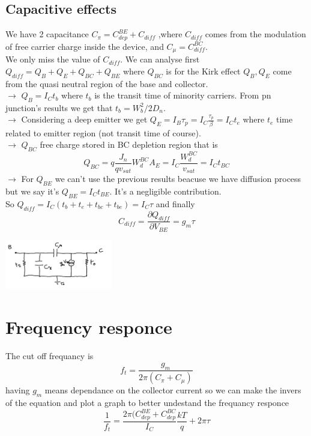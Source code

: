\subsection{Capacitive effects}
We have 2 capacitance $C_\pi=C_{dep}^{BE}+C_{diff}$ ,where $C_{diff}$ comes from the modulation of free carrier charge inside the device, and $C_\mu=C_{diff}^{BC}$.\\
We only miss the value of $C_{diff}$. We can analyse first $Q_{diff}=Q_B+Q_E+Q_{BC}+Q_{BE}$ where $Q_{BC}$ is for the Kirk effect $Q_B,Q_E$ come from the quasi neutral region of the base and collector.\\
\vspace{5mm}
$\rightarrow$ $Q_B=I_Ct_b$ where $t_b$ is the transit time of minority carriers. From pn junction's results we get that $t_b=W_b^2/2D_n$.\\
$\rightarrow$ Considering a deep emitter we get $Q_E=I_B\tau_p=I_C \frac{\tau_p}{\beta}=I_Ct_e$ where $t_e$ time related to emitter region (not transit time of course). \\
$\rightarrow$ $Q_{BC}$ free charge stored in BC depletion region that is
\begin{equation}
Q_{BC}=q \frac{J_n}{qv_{sat}}W_d^{BC}A_E=I_C \frac{W_d^{BC}}{v_{sat}}=I_C t_{BC}
\end{equation}
$\rightarrow$ For $Q_{BE}$ we can't use the previous results beacuse we have diffusion process but we say it's $Q_{BE}=I_Ct_{BE}$. It's a negligible contribution.\\
\vspace{5mm}
So $Q_{diff}=I_C(t_b+t_e+t_{bc}+t_{be})=I_C \tau$ and finally
\begin{equation}
C_{diff}=\frac{\partial Q_{diff}}{\partial V_{BE}}=g_m\tau
\end{equation}

\centering
\includegraphics[width=0.35\textwidth]{bjt13.png}\\
\raggedright

\section{Frequency responce}
The cut off frequancy is
\begin{equation}
f_t=\frac{g_m}{2\pi(C_\pi+C_\mu)}
\end{equation}
having $g_m$ means dependance on the collector current so we can make the invers of the equation and plot a graph to better undestand the frequancy responce
\begin{equation}
\frac{1}{f_t}=\frac{2\pi(C_{dep}^{BE}+C_{dep}^{BC}}{I_C}\frac{kT}{q}+2\pi\tau
\end{equation}


